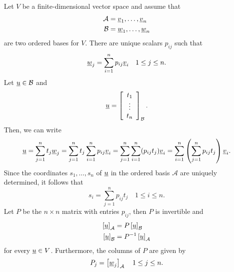 Let $V$ be a finite-dimensional vector space and assume that
\begin{align*}
\mathcal{A} &= \underline{v}_1, \ldots, \underline{v}_n \\
\mathcal{B} &= \underline{w}_1, \ldots, \underline{w}_n
\end{align*}
are two ordered bases for $V$.
There are unique scalars $p_{ij}$ such that
\begin{equation*}
\underline{w}_j = \sum_{i=1}^n p_{ij} \underline{v}_i \quad 1 \leq j \leq n.
\end{equation*}
Let $\underline{u} \in \mathcal{B}$ and
\begin{equation*}
\underline{u} = \left[ \begin{array}{c} t_1 \\ \vdots \\ t_n \end{array} \right]_{\mathcal{B}}.
\end{equation*}
Then, we can write
\begin{equation*}
\underline{u} = \sum_{j=1}^n t_j \underline{w}_j
= \sum_{j=1}^n t_j \sum_{i=1}^n p_{ij} \underline{v}_i
= \sum_{j=1}^n \sum_{i=1}^n ( p_{ij} t_j ) \underline{v}_i
= \sum_{i=1}^n \left( \sum_{j=1}^n p_{ij} t_j \right) \underline{v}_i.
\end{equation*}
Since the coordinates $s_1, \ldots, s_n$ of $\underline{u}$ in the ordered basis $\mathcal{A}$ are uniquely determined, it follows that
\begin{equation*}
s_i = \sum_{j=1}^n p_{ij} t_j \quad 1 \leq i \leq n.
\end{equation*}
Let $P$ be the $n \times n$ matrix with entries $p_{ij}$, then $P$ is invertible and
\begin{align*}
\left[ \underline{u} \right]_{\mathcal{A}} &= P \left[ \underline{u} \right]_{\mathcal{B}} \\
\left[ \underline{u} \right]_{\mathcal{B}} &= P^{-1} \left[ \underline{u} \right]_{\mathcal{A}}
\end{align*}
for every $\underline{u} \in V$.
Furthermore, the columns of $P$ are given by
\begin{equation*}
P_j = \left[ \underline{w}_j \right]_{\mathcal{A}} \quad 1 \leq j \leq n.
\end{equation*}

